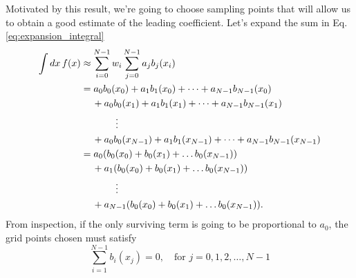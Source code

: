 \documentclass[preprint, amsmath, amssymb]{revtex4-1}
\begin{document}
  Motivated by this result, we're going to choose sampling points that will allow us to obtain a good estimate of the leading coefficient. Let's expand the sum in Eq. \ref{eq:expansion_integral}
  \begin{align}
    \int dx \, f(x) &\approx \sum_{i = 0}^{N-1} w_i \sum_{j = 0}^{N-1} a_j b_j(x_i) \nonumber \\
    &= a_0 b_0(x_0) + a_1 b_1(x_0) + \dots + a_{N-1} b_{N-1}(x_0) \nonumber \\
    & \hspace{12pt} + a_0 b_0(x_1) + a_1 b_1(x_1) + \dots + a_{N-1} b_{N-1}(x_1) \nonumber \\
    & \hspace{.5in} \vdots \nonumber \\
    & \hspace{12pt} + a_0 b_0(x_{N-1}) + a_1 b_1(x_{N-1}) + \dots + a_{N-1} b_{N-1} (x_{N-1}) \nonumber \\
    &= a_0(b_0(x_0) + b_0(x_1) + \dots b_0(x_{N-1})) \nonumber \\
    & \hspace{12pt} + a_1(b_0(x_0) + b_0(x_1) + \dots b_0(x_{N-1})) \nonumber \\
    & \hspace{.5in} \vdots \nonumber \\
    &\hspace{12pt} + a_{N-1}(b_0(x_0) + b_0(x_1) + \dots b_0(x_{N-1})).
  \end{align}
  From inspection, if the only surviving term is going to be proportional to $a_0$, the grid points chosen must satisfy
  \begin{equation} \label{eq:fourier_points}
    \sum_{i=1}^{N-1}b_i(x_j) = 0, \hspace{12pt} \text{for } j = 0, 1, 2, \dots, N-1
  \end{equation}
  
\end{document}
